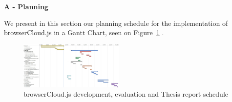 
% 
% 

\newpage
\textbf{A - Planning}

We present in this section our planning schedule for the implementation of browserCloud.js in a Gantt Chart, seen on Figure~\ref{fig:gantt} .


\begin{figure}[htbp]
  \centering
  \includegraphics[angle=90,width=0.46\textwidth]{img/gantt.jpg}
  \caption{browserCloud.js development, evaluation and Thesis report schedule}
  \label{fig:gantt}
\end{figure}

